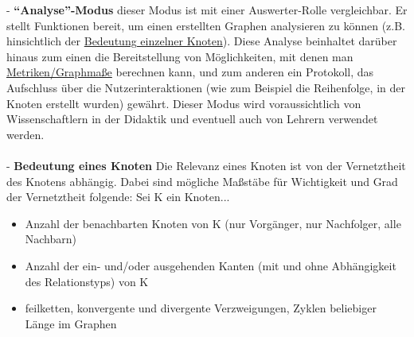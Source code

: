 \documentclass[enabledeprecatedfontcommands,fontsize=11pt,paper=a4,twoside]{scrartcl}
\newcounter{one}
\begin{document}
- \textbf{\hypertarget{``Analyse''-Modus}{``Analyse''-Modus}} dieser Modus ist mit einer Auswerter-Rolle vergleichbar. Er stellt Funktionen bereit, um einen erstellten Graphen analysieren zu können (z.B. hinsichtlich der \hyperlink{Bedeutung eines Knoten}{Bedeutung einzelner Knoten}). Diese Analyse beinhaltet darüber hinaus zum einen die Bereitstellung von Möglichkeiten, mit denen man \hyperlink{Metriken/Graphmaße}{Metriken/Graphmaße} berechnen kann, und zum anderen ein Protokoll, das Aufschluss über die Nutzerinteraktionen (wie zum Beispiel die Reihenfolge, in der Knoten erstellt wurden) gewährt. Dieser Modus wird voraussichtlich von Wissenschaftlern in der Didaktik und eventuell auch von Lehrern verwendet werden. \\ \\
- \textbf{\hypertarget{Bedeutung eines Knoten}{Bedeutung eines Knoten}} Die Relevanz eines Knoten ist von der Vernetztheit des Knotens abhängig. Dabei sind mögliche Maßstäbe für Wichtigkeit und Grad der Vernetztheit folgende: Sei K ein Knoten... \\
\begin{itemize}
\item Anzahl der benachbarten Knoten von K (nur Vorgänger, nur Nachfolger, alle Nachbarn)
\item Anzahl der ein- und/oder ausgehenden Kanten (mit und ohne Abhängigkeit des Relationstyps) von K
\item feilketten, konvergente und divergente Verzweigungen, Zyklen beliebiger Länge im Graphen
\end{itemize}

\newpage
\end{document}
